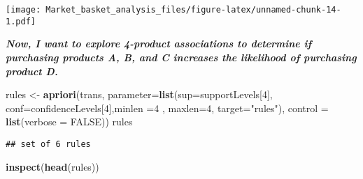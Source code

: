 \documentclass[
]{article}
\newenvironment{Shaded}{\begin{snugshade}}{\end{snugshade}}
\newcommand{\AttributeTok}[1]{\textcolor[rgb]{0.13,0.29,0.53}{#1}}
\newcommand{\ConstantTok}[1]{\textcolor[rgb]{0.56,0.35,0.01}{#1}}
\newcommand{\DecValTok}[1]{\textcolor[rgb]{0.00,0.00,0.81}{#1}}
\newcommand{\FunctionTok}[1]{\textcolor[rgb]{0.13,0.29,0.53}{\textbf{#1}}}
\newcommand{\NormalTok}[1]{#1}
\newcommand{\OtherTok}[1]{\textcolor[rgb]{0.56,0.35,0.01}{#1}}
\newcommand{\StringTok}[1]{\textcolor[rgb]{0.31,0.60,0.02}{#1}}
\begin{document}
\texttt{[image: Market\_basket\_analysis\_files/figure-latex/unnamed-chunk-14-1.pdf]}

\textbf{\emph{Now, I want to explore 4-product associations to determine
if purchasing products A, B, and C increases the likelihood of
purchasing product D.}}

\begin{Shaded}
\begin{Highlighting}[]
\NormalTok{rules }\OtherTok{\textless{}{-}} \FunctionTok{apriori}\NormalTok{(trans, }\AttributeTok{parameter=}\FunctionTok{list}\NormalTok{(}\AttributeTok{sup=}\NormalTok{supportLevels[}\DecValTok{4}\NormalTok{], }
                                                   \AttributeTok{conf=}\NormalTok{confidenceLevels[}\DecValTok{4}\NormalTok{],}\AttributeTok{minlen =}\DecValTok{4}\NormalTok{ , }\AttributeTok{maxlen=}\DecValTok{4}\NormalTok{, }\AttributeTok{target=}\StringTok{"rules"}\NormalTok{), }
                                \AttributeTok{control =} \FunctionTok{list}\NormalTok{(}\AttributeTok{verbose =} \ConstantTok{FALSE}\NormalTok{))}
\NormalTok{rules}
\end{Highlighting}
\end{Shaded}

\begin{verbatim}
## set of 6 rules
\end{verbatim}

\begin{Shaded}
\begin{Highlighting}[]
\FunctionTok{inspect}\NormalTok{(}\FunctionTok{head}\NormalTok{(rules))}
\end{Highlighting}
\end{Shaded}
\end{document}
